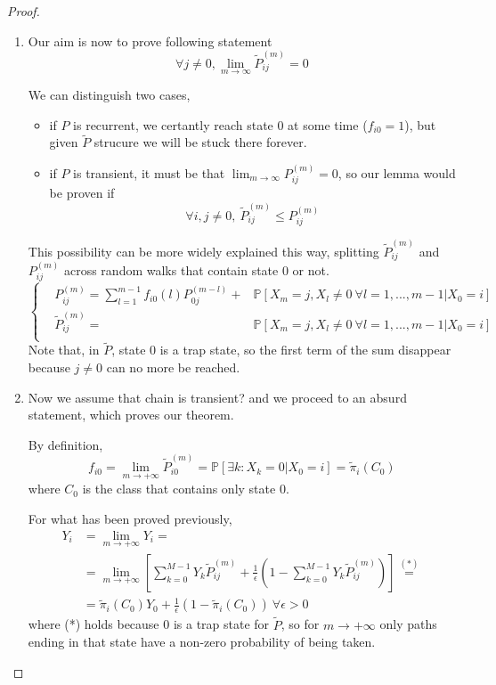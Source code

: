 \begin{proof}
\begin{enumerate}
		\item
		Our aim is now to prove following statement
		$$ \forall j \neq 0, \lim_{m \to \infty} \tilde{P}_{ij}^{(m)} = 0 $$

		We can distinguish two cases,
		\begin{itemize}
			\item if $P$ is recurrent, we certantly reach state 0 at some time ($f_{i0} = 1$), but given $\tilde{P}$ strucure we will be stuck there forever.
			\item if $P$ is transient, it must be that $\lim_{m \to \infty} P_{ij}^{(m)} = 0 $, so our lemma would be proven if
			$$ \forall i, j \neq 0, ~ \tilde{P}_{ij}^{(m)} \le P_{ij}^{(m)} $$
		\end{itemize}

		This possibility can be more widely explained this way, splitting $\tilde{P}_{ij}^{(m)}$ and $P_{ij}^{(m)}$ across random walks	 that contain state 0 or not.
		\begin{equation}
			\left\{ \begin{split}
				& P_{ij}^{(m)} = \sum_{l=1}^{m-1} f_{i0}(l) P_{0j}^{(m-l)} +
					& \mathbb{P}[X_m = j, X_l \neq 0 ~ \forall l = 1, ..., m-1 | X_0 = i] \\
				& \tilde{P}_{ij}^{(m)} =
					& \mathbb{P}[X_m = j, X_l \neq 0 ~ \forall l = 1, ..., m-1 | X_0 = i] \\
			\end{split} \right.
		\end{equation}
		Note that, in $\tilde{P}$, state $0$ is a trap state, so the first term of the sum disappear because $j \neq 0$ can no more be reached.

		\item
		Now we assume that chain is transient? and we proceed to an absurd statement, which proves our theorem.

		By definition,
		$$ f_{i0} = \lim_{m \to +\infty} \tilde{P}_{i0}^{(m)} = \mathbb{P}[\exists k : X_k = 0 | X_0 = i] = \tilde{\pi}_i(C_0)$$
		where $C_0$ is the class that contains only state 0.

		For what has been proved previously,
		\begin{equation}\begin{split}
			Y_i & = \lim_{m \to +\infty} Y_i = \\
				& = \lim_{m \to +\infty} \left[ \sum_{k=0}^{M-1} Y_k \tilde{P}_{ij}^{(m)}
					+ \frac{1}{\epsilon} \left( 1 - \sum_{k=0}^{M-1} Y_k \tilde{P}_{ij}^{(m)} \right) \right] \stackrel{(*)}{=} \\
			& = \tilde{\pi}_i(C_0) Y_0 + \frac{1}{\epsilon} \left( 1 - \tilde{\pi}_i(C_0) \right) ~ \forall \epsilon > 0
		\end{split}\end{equation}
		where (*) holds because 0 is a trap state for $\tilde{P}$, so for $m \to +\infty$ only paths ending in that state have a non-zero probability of being taken.


\end{enumerate}
\end{proof}

